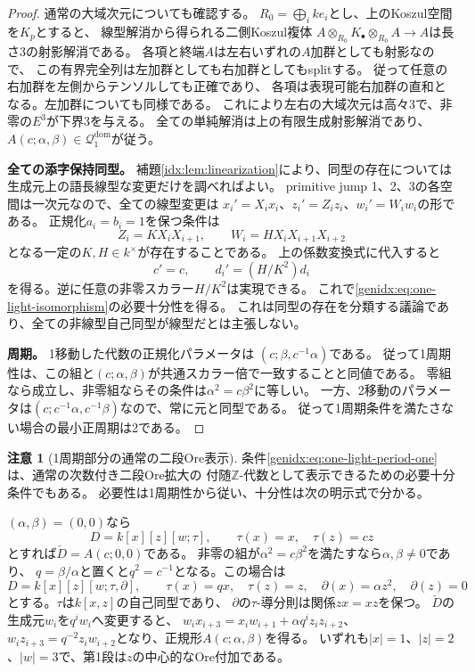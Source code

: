 \documentclass[11pt,a4paper]{ltjsarticle}
\theoremstyle{definition}
\newtheorem{remark}[theorem]{注意}
\begin{document}
\begin{proof}
通常の大域次元についても確認する。
$R_0=\bigoplus_i ke_i$とし、上のKoszul空間を$K_p$とすると、
線型解消から得られる二側Koszul複体
$A\otimes_{R_0}K_\bullet\otimes_{R_0}A\to A$は長さ3の射影解消である。
各項と終端$A$は左右いずれの$A$加群としても射影なので、
この有界完全列は左加群としても右加群としてもsplitする。
従って任意の右加群を左側からテンソルしても正確であり、
各項は表現可能右加群の直和となる。左加群についても同様である。
これにより左右の大域次元は高々3で、非零の$E^3$が下界3を与える。
全ての単純解消は上の有限生成射影解消であり、
$A(c;\alpha,\beta)\in\mathcal Q_1^{\mathrm{dom}}$が従う。

\par\smallskip\noindent\textbf{全ての添字保持同型。}\quad
補題\ref{idx:lem:linearization}により、同型の存在については
生成元上の語長線型な変更だけを調べればよい。
primitive jump 1、2、3の各空間は一次元なので、全ての線型変更は
$x_i'=X_i x_i$、$z_i'=Z_i z_i$、$w_i'=W_i w_i$の形である。
正規化$a_i=b_i=1$を保つ条件は
\[
Z_i=KX_iX_{i+1},\qquad
W_i=HX_iX_{i+1}X_{i+2}
\]
となる一定の$K,H\in k^\times$が存在することである。
上の係数変換式に代入すると
\[
c'=c,\qquad d_i'=(H/K^2)d_i
\]
を得る。逆に任意の非零スカラー$H/K^2$は実現できる。
これで\eqref{genidx:eq:one-light-isomorphism}の必要十分性を得る。
これは同型の存在を分類する議論であり、全ての非線型自己同型が線型だとは主張しない。

\par\smallskip\noindent\textbf{周期。}\quad
1移動した代数の正規化パラメータは
$(c;\beta,c^{-1}\alpha)$である。
従って1周期性は、この組と$(c;\alpha,\beta)$が共通スカラー倍で一致することと同値である。
零組なら成立し、非零組ならその条件は$\alpha^2=c\beta^2$に等しい。
一方、2移動のパラメータは$(c;c^{-1}\alpha,c^{-1}\beta)$なので、常に元と同型である。
従って1周期条件を満たさない場合の最小正周期は2である。
\end{proof}

\begin{remark}[1周期部分の通常の二段Ore表示]
条件\eqref{genidx:eq:one-light-period-one}は、通常の次数付き二段Ore拡大の
付随$\mathbb Z$-代数として表示できるための必要十分条件でもある。
必要性は1周期性から従い、十分性は次の明示式で分かる。

$(\alpha,\beta)=(0,0)$なら
\[
D=k[x][z][w;\tau],\qquad \tau(x)=x,\quad\tau(z)=cz
\]
とすれば$\check D=A(c;0,0)$である。
非零の組が$\alpha^2=c\beta^2$を満たすなら$\alpha,\beta\ne0$であり、
$q=\beta/\alpha$と置くと$q^2=c^{-1}$となる。この場合は
\[
D=k[x][z][w;\tau,\partial],\qquad
\tau(x)=qx,\quad\tau(z)=z,\quad
\partial(x)=\alpha z^2,\quad\partial(z)=0
\]
とする。$\tau$は$k[x,z]$の自己同型であり、
$\partial$の$\tau$-導分則は関係$zx=xz$を保つ。
$\check D$の生成元$w_i$を$q^i w_i$へ変更すると、
$w_i x_{i+3}=x_i w_{i+1}+\alpha q^i z_i z_{i+2}$、
$w_i z_{i+3}=q^{-2}z_i w_{i+2}$となり、正規形$A(c;\alpha,\beta)$を得る。
いずれも$|x|=1$、$|z|=2$、$|w|=3$で、第1段は$z$の中心的なOre付加である。
\end{remark}
\end{document}
